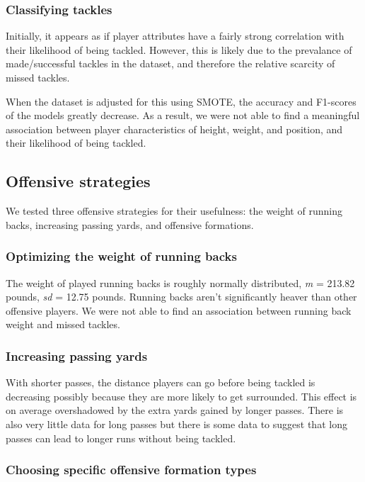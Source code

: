 \documentclass[bibtex, sigconf, hyperref={colorlinks=true,linkcolor=blue,urlcolor=blue}]{acmart}
\begin{document}
\subsubsection{Classifying tackles}


Initially, it appears as if player attributes have a fairly strong
correlation with their likelihood of being tackled. However, this is likely due
to the prevalance of made/successful tackles in the dataset, and therefore the
relative scarcity of missed tackles.

When the dataset is adjusted for this using SMOTE, the accuracy and F1-scores of
the models greatly decrease. As a result, we were not able to find a meaningful association
between player characteristics of height, weight, and position, and their likelihood
of being tackled.

\subsection{Offensive strategies}

We tested three offensive strategies for their usefulness:
the weight of running backs, increasing passing yards, and offensive formations.

\subsubsection{Optimizing the weight of running backs}

The weight of played running backs is roughly normally distributed, \textit{m} =
213.82 pounds, \textit{sd} = 12.75 pounds. Running backs aren't significantly
heaver than other offensive players. We were not able to find an association
between running back weight and missed tackles.

\subsubsection{Increasing passing yards}

With shorter passes, the distance players can go before being tackled is
decreasing possibly because they are more likely to get surrounded. This effect
is on average overshadowed by the extra yards gained by longer passes.
There is also very little data for long passes but there is some data to suggest
that long passes can lead to longer runs without being tackled.

\subsubsection{Choosing specific offensive formation types}
\end{document}
